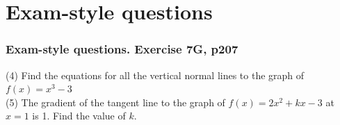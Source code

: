 \documentclass{beamer}
\begin{document}
\section{Exam-style questions}
\frame
{
  \frametitle{Exam-style questions. Exercise 7G, p207}
  (4) Find the equations for all the vertical normal lines to the graph of  $f(x)=x^3-3$\\[20pt]
  (5) The gradient of the tangent line to the graph of  $f(x)=2x^2+kx-3$ at $x=1$ is 1. Find the value of $k$.
  }
\end{document}
